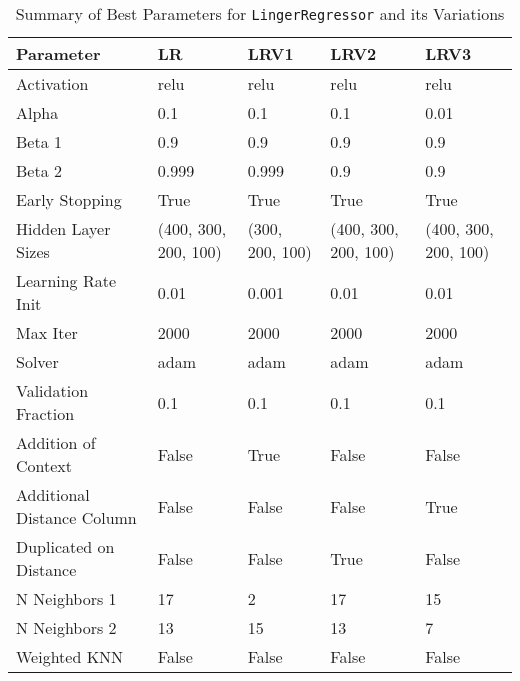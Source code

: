 \documentclass[a4paper, 12pt]{report}
\begin{document}
\begin{table}[H]
    \centering
    \caption{Summary of Best Parameters for \texttt{LingerRegressor} and its Variations}
    \label{tab:best_parameters_summary_exp1}
    \footnotesize
    \begin{tabular}{|l|l|l|l|l|}
    \hline
    \textbf{Parameter} & \textbf{LR} & \textbf{LRV1} & \textbf{LRV2} & \textbf{LRV3} \\
    \hline
    Activation & relu & relu & relu & relu \\
    Alpha & 0.1 & 0.1 & 0.1 & 0.01 \\
    Beta 1 & 0.9 & 0.9 & 0.9 & 0.9 \\
    Beta 2 & 0.999 & 0.999 & 0.9 & 0.9 \\
    Early Stopping & True & True & True & True \\
    Hidden Layer Sizes & (400, 300, 200, 100) & (300, 200, 100) & (400, 300, 200, 100) & (400, 300, 200, 100) \\
    Learning Rate Init & 0.01 & 0.001 & 0.01 & 0.01 \\
    Max Iter & 2000 & 2000 & 2000 & 2000 \\
    Solver & adam & adam & adam & adam \\
    Validation Fraction & 0.1 & 0.1 & 0.1 & 0.1 \\
    Addition of Context & False & True & False & False \\
    Additional Distance Column & False & False & False & True \\
    Duplicated on Distance & False & False & True & False \\
    N Neighbors 1 & 17 & 2 & 17 & 15 \\
    N Neighbors 2 & 13 & 15 & 13 & 7 \\
    Weighted KNN & False & False & False & False \\
    \hline
    \end{tabular}
\end{table}
\clearpage
\end{document}

